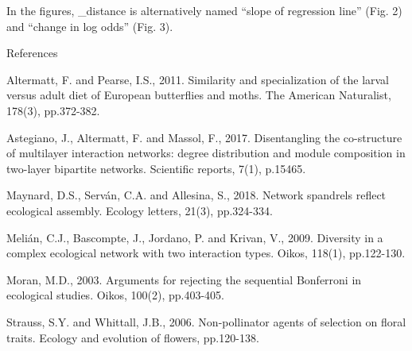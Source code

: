\documentclass[12pt]{letter}
\begin{document}
In the figures, \beta_distance is alternatively named “slope of regression line” (Fig. 2) and “change in log odds” (Fig. 3).

References

Altermatt, F. and Pearse, I.S., 2011. Similarity and specialization of the larval versus adult diet of European butterflies and moths. The American Naturalist, 178(3), pp.372-382.

Astegiano, J., Altermatt, F. and Massol, F., 2017. Disentangling the co-structure of multilayer interaction networks: degree distribution and module composition in two-layer bipartite networks. Scientific reports, 7(1), p.15465.

Maynard, D.S., Serván, C.A. and Allesina, S., 2018. Network spandrels reflect ecological assembly. Ecology letters, 21(3), pp.324-334.

Melián, C.J., Bascompte, J., Jordano, P. and Krivan, V., 2009. Diversity in a complex ecological network with two interaction types. Oikos, 118(1), pp.122-130.

Moran, M.D., 2003. Arguments for rejecting the sequential Bonferroni in ecological studies. Oikos, 100(2), pp.403-405.

Strauss, S.Y. and Whittall, J.B., 2006. Non-pollinator agents of selection on floral traits. Ecology and evolution of flowers, pp.120-138.

  \newpage


 

\end{document}
